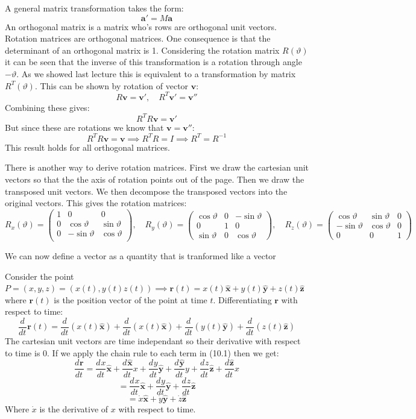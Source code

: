 \documentclass{article}
\newcommand{\vh}[1]{\vec{\hat{#1}}}
\renewcommand{\vec}[1]{\bm{#1}}
\newcommand{\vv}[1]{\vec{#1}}
\newcommand{\dv}[3][]{\frac{d^{#1}{#2}}{d{#3}^{#1}}}
\newcommand{\diff}[2][]{\frac{d^{#1}}{d{#2}^{#1}}}
\begin{document}
A general matrix transformation takes the form:
\[\vv a'=M\vv a\]
An orthogonal matrix is a matrix who's rows are orthogonal unit vectors. Rotation matrices are orthogonal matrices. One consequence is that the determinant of an orthogonal matrix is 1. Considering the rotation matrix \(R(\vartheta)\) it can be seen that the inverse of this transformation is a rotation through angle \(-\vartheta\). As we showed last lecture this is equivalent to a transformation by matrix \(R^T(\vartheta)\). This can be shown by rotation of vector \(\vv v\):
\[R\vv v=\vv v',\quad R^T\vv v'=\vv v''\]
Combining these gives:
\[R^TR\vv v=\vv v'\]
But since these are rotations we know that \(\vv v=\vv v''\):
\[R^TR\vv v=\vv v\implies R^TR=I\implies R^T=R^{-1}\]
This result holds for all orthogonal matrices.

There is another way to derive rotation matrices. First we draw the cartesian unit vectors so that the the axis of rotation points out of the page. Then we draw the transposed unit vectors. We then decompose the transposed vectors into the original vectors. This gives the rotation matrices:
\[R_x(\vartheta)=
\begin{pmatrix}
1 & 0 & 0\\
0 & \cos\vartheta & \sin\vartheta\\
0 & -\sin\vartheta & \cos\vartheta\\
\end{pmatrix}
,\quad R_y(\vartheta)=
\begin{pmatrix}
\cos\vartheta & 0 & -\sin\vartheta\\
0 & 1 & 0\\
\sin\vartheta & 0 & \cos\vartheta
\end{pmatrix}
,\quad R_z(\vartheta)=
\begin{pmatrix}
\cos\vartheta & \sin\vartheta & 0\\
-\sin\vartheta & \cos\vartheta & 0\\
0 & 0 & 1
\end{pmatrix}
\]

We can now define a vector as a quantity that is tranformed like a vector

Consider the point \(P=(x,y,z)=(x(t),y(t)z(t))\implies\vv r(t)=x(t)\vh x+y(t)\vh y+z(t)\vh z\) where \(\vv r(t)\) is the position vector of the point at time \(t\). Differentiating \(\vv r\) with respect to time:
\[\diff t\vv r(t)=\diff t(x(t)\vh x)+\diff t(x(t)\vh x)+\diff t(y(t)\vh y)+\diff t(z(t)\vh z)\tag{10.1}\]
The cartesian unit vectors are time independant so their derivative with respect to time is 0. If we apply the chain rule to each term in (10.1) then we get:
\[\dv{\vv r}{t}=\dv xt \vh x+\dv{\vh x}{t} x+\dv yt \vh y+\dv{\vh y}{t} y+\dv zt \vh z+\dv{\vh z}{t} x\]
\[=\dv xt \vh x+\dv yt \vh y+\dv zt \vh z\]
\[=\dot x\vh x+\dot y\vh y+\dot z\vh z\]
Where \(\dot x\) is the derivative of \(x\) with respect to time.
\end{document}
